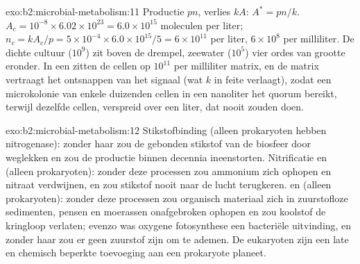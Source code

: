 \begin{solution}{exo:b2:microbial-metabolism:11}
Productie $pn$, verlies $kA$: $A^* = pn/k$. $A_c = 10^{-8}\times
6.02\times 10^{23} = 6.0\times 10^{15}$ moleculen per liter; $n_c =
kA_c/p = 5\times 10^{-4}\times 6.0\times 10^{15}/5 = 6\times 10^{11}$
per liter, $6\times 10^{8}$ per milliliter. De dichte cultuur
($10^{9}$) zit boven de drempel, zeewater ($10^{5}$) vier ordes van
grootte eronder. In een  zitten de cellen op $10^{11}$ per
milliliter matrix, en de matrix vertraagt het ontsnappen van het signaal
(wat $k$ in feite verlaagt), zodat een microkolonie van enkele duizenden
cellen in een nanoliter het quorum bereikt, terwijl dezelfde cellen,
verspreid over een liter, dat nooit zouden doen.
\end{solution}

\begin{solution}{exo:b2:microbial-metabolism:12}
Stikstofbinding (alleen prokaryoten hebben nitrogenase): zonder haar zou
de gebonden stikstof van de biosfeer door  weglekken en
zou de productie binnen decennia ineenstorten. Nitrificatie en
 (alleen prokaryoten): zonder deze processen zou ammonium
zich ophopen en nitraat verdwijnen, en zou stikstof nooit naar de lucht
terugkeren.  en  (alleen prokaryoten):
zonder deze processen zou organisch materiaal zich in zuurstofloze
sedimenten, pensen en moerassen onafgebroken ophopen en zou koolstof de
kringloop verlaten; evenzo was oxygene fotosynthese een bacteriële
uitvinding, en zonder haar zou er geen zuurstof zijn om te ademen. De
eukaryoten zijn een late en chemisch beperkte toevoeging aan een
prokaryote planeet.
\end{solution}

